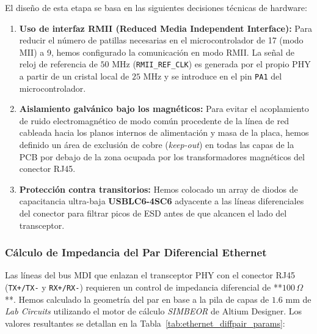 \documentclass[12pt,a4paper]{article}
\begin{document}
El diseño de esta etapa se basa en las siguientes decisiones técnicas de hardware:
\begin{enumerate}
    \item \textbf{Uso de interfaz RMII (Reduced Media Independent Interface):} Para reducir el número de patillas necesarias en el microcontrolador de 17 (modo MII) a 9, hemos configurado la comunicación en modo RMII. La señal de reloj de referencia de $50\text{ MHz}$ (\texttt{RMII\_REF\_CLK}) es generada por el propio PHY a partir de un cristal local de $25\text{ MHz}$ y se introduce en el pin \texttt{PA1} del microcontrolador.
    \item \textbf{Aislamiento galvánico bajo los magnéticos:} Para evitar el acoplamiento de ruido electromagnético de modo común procedente de la línea de red cableada hacia los planos internos de alimentación y masa de la placa, hemos definido un área de exclusión de cobre (\textit{keep-out}) en todas las capas de la PCB por debajo de la zona ocupada por los transformadores magnéticos del conector RJ45.
    \item \textbf{Protección contra transitorios:} Hemos colocado un array de diodos de capacitancia ultra-baja \textbf{USBLC6-4SC6} adyacente a las líneas diferenciales del conector para filtrar picos de ESD antes de que alcancen el lado del transceptor.
\end{enumerate}

\subsubsection{Cálculo de Impedancia del Par Diferencial Ethernet}

Las líneas del bus MDI que enlazan el transceptor PHY con el conector RJ45 (\texttt{TX+/TX-} y \texttt{RX+/RX-}) requieren un control de impedancia diferencial de **$100\,\Omega$**. Hemos calculado la geometría del par en base a la pila de capas de $1.6\text{ mm}$ de \textit{Lab Circuits} utilizando el motor de cálculo \textit{SIMBEOR} de Altium Designer. Los valores resultantes se detallan en la Tabla~\ref{tab:ethernet_diffpair_params}:
\end{document}
